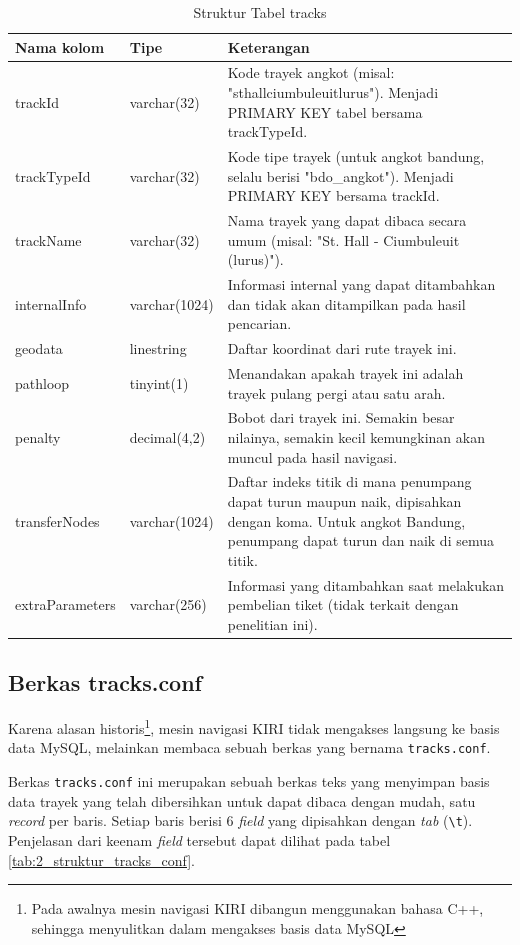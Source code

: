 \begin{table}
	\caption{Struktur Tabel tracks}
	\label{tab:2_struktur_tabel_tracks}
	\begin{tabular}{|p{3cm}|p{2.5cm}|p{9.5cm}|}
		\hline
		Nama kolom & Tipe & Keterangan \\
		\hline
		trackId & varchar(32) & Kode trayek angkot (misal: "sthallciumbuleuitlurus"). Menjadi PRIMARY KEY tabel bersama trackTypeId. \\
		trackTypeId & varchar(32) & Kode tipe trayek (untuk angkot bandung, selalu berisi "bdo\_angkot"). Menjadi PRIMARY KEY bersama trackId. \\
		trackName & varchar(32) & Nama trayek yang dapat dibaca secara umum (misal: "St. Hall - Ciumbuleuit (lurus)"). \\
		internalInfo & varchar(1024) & Informasi internal yang dapat ditambahkan dan tidak akan ditampilkan pada hasil pencarian. \\
		geodata & linestring & Daftar koordinat dari rute trayek ini. \\
		pathloop & tinyint(1) & Menandakan apakah trayek ini adalah trayek pulang pergi atau satu arah. \\
		penalty & decimal(4,2) & Bobot dari trayek ini. Semakin besar nilainya, semakin kecil kemungkinan akan muncul pada hasil navigasi. \\
		transferNodes & varchar(1024) & Daftar indeks titik di mana penumpang dapat turun maupun naik, dipisahkan dengan koma. Untuk angkot Bandung, penumpang dapat turun dan naik di semua titik. \\
		extraParameters & varchar(256) & Informasi yang ditambahkan saat melakukan pembelian tiket (tidak terkait dengan penelitian ini). \\
		\hline
	\end{tabular}
\end{table}

\subsection{Berkas tracks.conf}
Karena alasan historis\footnote{Pada awalnya mesin navigasi KIRI dibangun menggunakan bahasa C++, sehingga menyulitkan dalam mengakses basis data MySQL}, mesin navigasi KIRI tidak mengakses langsung ke basis data MySQL, melainkan membaca sebuah berkas yang bernama \verb/tracks.conf/.

Berkas \verb/tracks.conf/ ini merupakan sebuah berkas teks yang menyimpan basis data trayek yang telah dibersihkan untuk dapat dibaca dengan mudah, satu \textit{record} per baris. Setiap baris berisi 6 \textit{field} yang dipisahkan dengan \textit{tab} (\verb/\t/). Penjelasan dari keenam \textit{field} tersebut dapat dilihat pada tabel \ref{tab:2_struktur_tracks_conf}.


